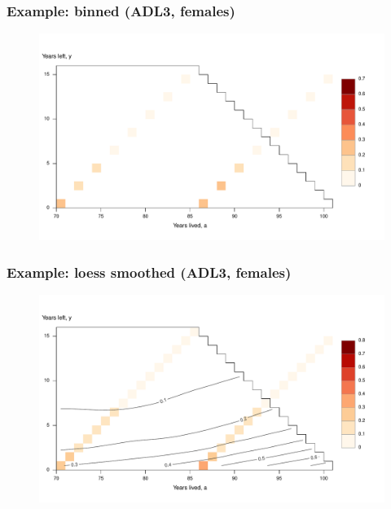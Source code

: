 \documentclass{beamer}
\begin{document}

\begin{frame}
\frametitle{Example: binned (ADL3, females)}
\begin{figure}
\includegraphics[width=\linewidth]{Figures/SurfExampleFemalesADL3_1}
\end{figure}
\end{frame}
\begin{frame}
\frametitle{Example: loess smoothed (ADL3, females)}
\begin{figure}
\includegraphics[width=\linewidth]{Figures/SurfExampleFemalesADL3_2}
\end{figure}
\end{frame}
\end{document}
